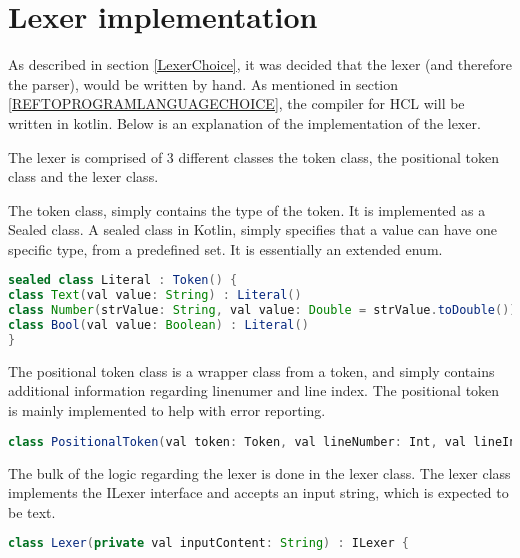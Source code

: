\section{Lexer implementation}
As described in section \ref{LexerChoice}, it was decided that the lexer (and therefore the parser), would be written by hand.
As mentioned in section \ref{REFTOPROGRAMLANGUAGECHOICE}, the compiler for HCL will be written in kotlin.
Below is an explanation of the implementation of the lexer.

The lexer is comprised of 3 different classes the token class, the positional token class and the lexer class.

The token class, simply contains the type of the token. 
It is implemented as a Sealed class. 
A sealed class in Kotlin, simply specifies that a value can have one specific type, from a predefined set\cite{KotlinSealed}.
It is essentially an extended enum.
\begin{lstlisting}[language=java,label=lis:tokenClass,caption=A snippet from the token class .,firstnumber=9]
sealed class Literal : Token() {
class Text(val value: String) : Literal()
class Number(strValue: String, val value: Double = strValue.toDouble()) : Literal()
class Bool(val value: Boolean) : Literal()
}
\end{lstlisting}

The positional token class is a wrapper class from a token, and simply contains additional information regarding linenumer and line index.
The positional token is mainly implemented to help with error reporting. %
\begin{lstlisting}[language=java,label=lis:PositionalTokenClass,caption=A snippet from the token class .,firstnumber=10]
class PositionalToken(val token: Token, val lineNumber: Int, val lineIndex: Int)
\end{lstlisting}

The bulk of the logic regarding the lexer is done in the lexer class.
The lexer class implements the ILexer interface and accepts an input string, which is expected to be text.

\begin{lstlisting}[language=java,label=lis:Lexer,caption=The Lexer .,firstnumber=8]
class Lexer(private val inputContent: String) : ILexer {
\end{lstlisting}

